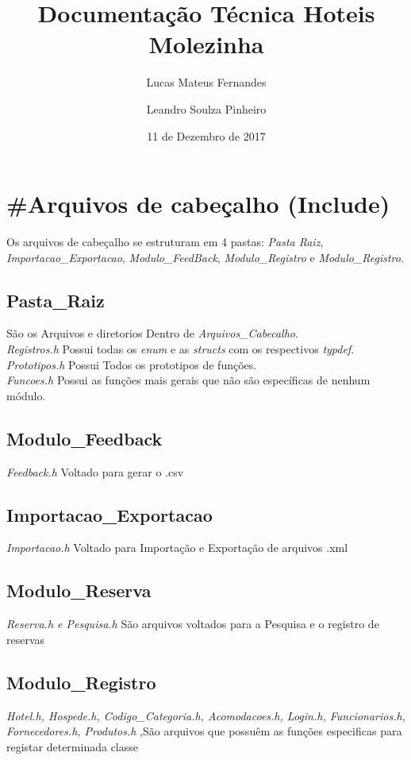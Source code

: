 \documentclass{article}
\title{Documentação Técnica Hoteis Molezinha}
\date{11 de Dezembro de 2017}
\author{Lucas Mateus Fernandes \and Leandro Soulza Pinheiro}
\begin{document}
  \maketitle
  \newpage
  \tableofcontents %
  \newpage


  \section{\#Arquivos de cabeçalho (Include)}
    Os arquivos de cabeçalho se estruturam em 4 pastas: \textit{ Pasta Raiz}, \textit{Importacao\_Exportacao}, \textit{Modulo\_FeedBack}, \textit{Modulo\_Registro} e \textit{Modulo\_Registro}.
    \subsection{Pasta\_Raiz}
      São os Arquivos e diretorios Dentro de  \textit{Arquivos\_Cabecalho}.\\
      \textit{Registros.h} Possui todas os  \textit{enum} e as \textit{structs} com os respectivos \textit{typdef}.\\
      \textit{Prototipos.h} Possui Todos os prototipos de funções.\\ 
      \textit{Funcoes.h} Possui as funções mais gerais que não são específicas de nenhum módulo.\\
    \subsection{Modulo\_Feedback}
      \textit{Feedback.h} Voltado para gerar o .csv\\
    \subsection{Importacao\_Exportacao}
      \textit{Importacao.h} Voltado para Importação e Exportação de arquivos .xml\\
    \subsection{Modulo\_Reserva}
      \textit{Reserva.h e Pesquisa.h} São arquivos voltados para a Pesquisa e o registro de reservas\\
    \subsection{Modulo\_Registro}
      \textit{Hotel.h, Hospede.h, Codigo\_Categoria.h, Acomodacoes.h, Login.h, Funcionarios.h, Fornecedores.h, Produtos.h} ,São arquivos que possuêm as funções especificas para registar determinada classe\\
  \newpage
\end{document}
